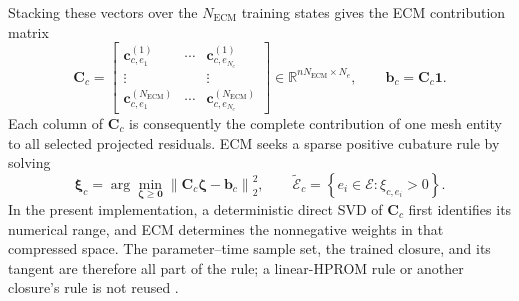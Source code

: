 \documentclass[11pt]{article}
\begin{document}
Stacking these vectors over the $N_{\mathrm{ECM}}$ training states gives the
ECM contribution matrix
\begin{equation}
\mathbf C_c
=
\begin{bmatrix}
\mathbf c_{c,e_1}^{(1)} & \cdots & \mathbf c_{c,e_{N_e}}^{(1)}\\
\vdots & & \vdots\\
\mathbf c_{c,e_1}^{(N_{\mathrm{ECM}})} & \cdots &
\mathbf c_{c,e_{N_e}}^{(N_{\mathrm{ECM}})}
\end{bmatrix}
\in\mathbb R^{nN_{\mathrm{ECM}}\times N_e},
\qquad
\mathbf b_c=\mathbf C_c\mathbf 1.
\label{eq:ann-ecm-entity-contribution}
\end{equation}
Each column of $\mathbf C_c$ is consequently the complete contribution of one
mesh entity to all selected projected residuals. ECM seeks a sparse positive
cubature rule by solving
\begin{equation}
\boldsymbol\xi_c
=
\arg\min_{\boldsymbol\zeta\geq\mathbf0}
\left\|\mathbf C_c\boldsymbol\zeta-\mathbf b_c\right\|_2^2,
\qquad
\widetilde{\mathcal E}_c
=\left\{e_i\in\mathcal E:\xi_{c,e_i}>0\right\}.
\label{eq:ann-ecm-cubature}
\end{equation}
In the present implementation, a deterministic direct SVD of $\mathbf C_c$
first identifies its numerical range, and ECM determines the nonnegative
weights in that compressed space.  The parameter--time sample set, the trained
closure, and its tangent are therefore all part of the rule; a linear-HPROM
rule or another closure's rule is not reused
\cite{hernandez2017dimensional,hernandez2020multiscale,de2023hyper,ares2026closure}.
\end{document}
